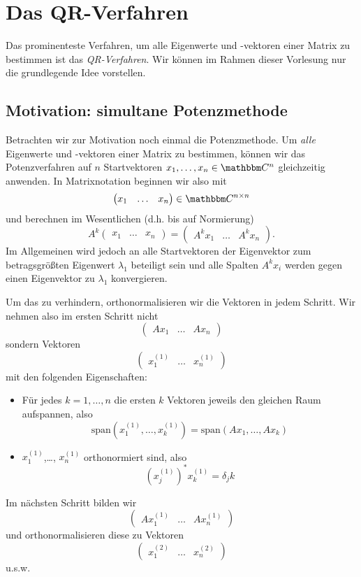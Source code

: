 \documentclass[12pt,a4paper]{book}
\theoremstyle{break}
\theoremstyle{nonumberplain}
\newcommand{\C}{\mathbbm C}
\newcommand{\1}{\mathbbm{1}} 			      	%
\begin{document}
\section{Das QR-Verfahren}

Das prominenteste Verfahren, um alle Eigenwerte und -vektoren einer Matrix zu bestimmen ist das \emph{QR-Verfahren}.
Wir können im Rahmen dieser Vorlesung nur die grundlegende Idee vorstellen.


\subsection{Motivation: simultane Potenzmethode}

Betrachten wir zur Motivation noch einmal die Potenzmethode. Um \emph{alle} Eigenwerte und
-vektoren einer Matrix zu bestimmen, können wir das Potenzverfahren auf $n$ Startvektoren $x_1,\ldots,x_n\in \C^n$ gleichzeitig anwenden.
In Matrixnotation beginnen wir also mit 
\[
\begin{pmatrix} x_1 & \ldots & x_n\end{pmatrix}\in \C^{n\times n}
\]
und berechnen im Wesentlichen (d.h. bis auf Normierung)
\[
A^k \begin{pmatrix} x_1 & \ldots & x_n\end{pmatrix}= \begin{pmatrix} A^k x_1 & \ldots & A^k x_n\end{pmatrix}.
\]
Im Allgemeinen wird jedoch an alle Startvektoren der Eigenvektor zum betragsgrößten Eigenwert $\lambda_1$ beteiligt sein und alle Spalten $A^k x_i$ werden gegen
einen Eigenvektor zu $\lambda_1$ konvergieren.

Um das zu verhindern, orthonormalisieren wir die Vektoren in jedem Schritt. Wir nehmen also im ersten Schritt nicht  
\[
\begin{pmatrix} A x_1 & \ldots & A x_n\end{pmatrix}
\]
sondern Vektoren
\[
\begin{pmatrix} x^{(1)}_1 & \ldots & x^{(1)}_n \end{pmatrix}
\]
mit den folgenden Eigenschaften:
\begin{itemize}
\item Für jedes $k=1,\ldots,n$ die ersten $k$ Vektoren jeweils den gleichen Raum aufspannen, also
\[
\mathrm{span} (x^{(1)}_1,\ldots,x^{(1)}_k ) = \mathrm{span} (A x_1,\ldots, A x_k)
\]
\item $x^{(1)}_1$,\ldots, $x^{(1)}_n$ orthonormiert sind, also
\[
(x^{(1)}_j)^*x^{(1)}_k=\delta_jk
\]
\end{itemize}
Im nächsten Schritt bilden wir 
\[
\begin{pmatrix} A x^{(1)}_1 & \ldots & A x^{(1)}_n \end{pmatrix}
\]
und orthonormalisieren diese zu Vektoren
\[
\begin{pmatrix} x^{(2)}_1 & \ldots & x^{(2)}_n \end{pmatrix}
\]
u.s.w.
\end{document}
